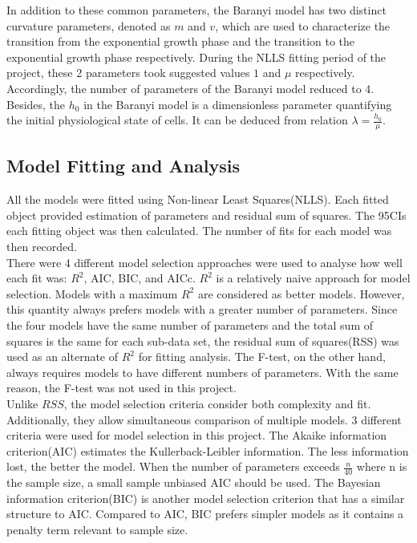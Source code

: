 In addition to these common parameters, the Baranyi model has two distinct curvature parameters, denoted as $m$ and $v$, which are used to characterize the transition from the exponential growth phase and the transition to the exponential growth phase respectively. During the NLLS fitting period of the project, these 2 parameters took suggested values $1$ and $\mu$ respectively\citep{Baranyi1993}. Accordingly, the number of parameters of the Baranyi model reduced to 4. Besides, the $h_0$ in the Baranyi model is a dimensionless parameter quantifying the initial physiological state of cells. It can be deduced from relation $\lambda = \frac{h_0}{\mu}$.\\




\subsection{Model Fitting and Analysis}
All the models were fitted using Non-linear Least Squares(NLLS). Each fitted object provided estimation of parameters and residual sum of squares. The 95CIs each fitting object was then calculated. The number of fits for each model was then recorded.\\

There were 4 different model selection approaches were used to analyse how well each fit was: $R^2$, AIC, BIC, and AICc. $R^2$ is a relatively naive approach for model selection. Models with a maximum $R^2$ are considered as better models. However, this quantity always prefers models with a greater number of parameters. Since the four models have the same number of parameters and the total sum of squares is the same for each sub-data set, the residual sum of squares(RSS) was used as an alternate of $R^2$ for fitting analysis. The F-test, on the other hand, always requires models to have different numbers of parameters. With the same reason, the F-test was not used in this project.\\

Unlike $RSS$, the model selection criteria consider both complexity and fit\citep{JOHNSON2004101}. Additionally, they allow simultaneous comparison of multiple models. 3 different criteria were used for model selection in this project. The Akaike information criterion(AIC) estimates the Kullerback-Leibler information\citep{mcelreath2016statistical}. The less information lost, the better the model. When the number of parameters exceeds $\frac{n}{40}$ where n is the sample size, a small sample unbiased AIC should be used\citep{JOHNSON2004101}. The Bayesian information criterion(BIC) is another model selection criterion that has a similar structure to AIC. Compared to AIC, BIC prefers simpler models as it contains a penalty term relevant to sample size.\\


